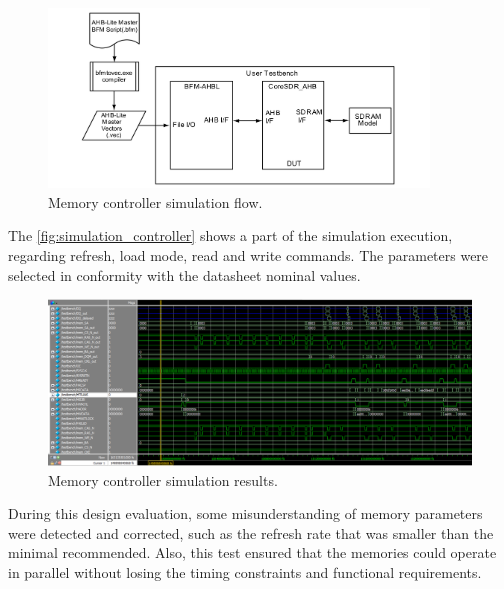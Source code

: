 \begin{figure}[!ht]
    \begin{center}
        \includegraphics[width=0.9\textwidth]{figures/flow_simulation.png}
        \caption{Memory controller simulation flow.}
        \label{fig:simulation_flow}
    \end{center}
\end{figure}

The \autoref{fig:simulation_controller} shows a part of the simulation execution, regarding refresh, load mode, read and write commands. The parameters were selected in conformity with the datasheet nominal values.

\begin{figure}[!ht]
    \begin{center}
        \includegraphics[width=\textwidth]{figures/simulation_controller.png}
        \caption{Memory controller simulation results.}
        \label{fig:simulation_controller}
    \end{center}
\end{figure}

During this design evaluation, some misunderstanding of memory parameters were detected and corrected, such as the refresh rate that was smaller than the minimal recommended. Also, this test ensured that the memories could operate in parallel without losing the timing constraints and functional requirements.


